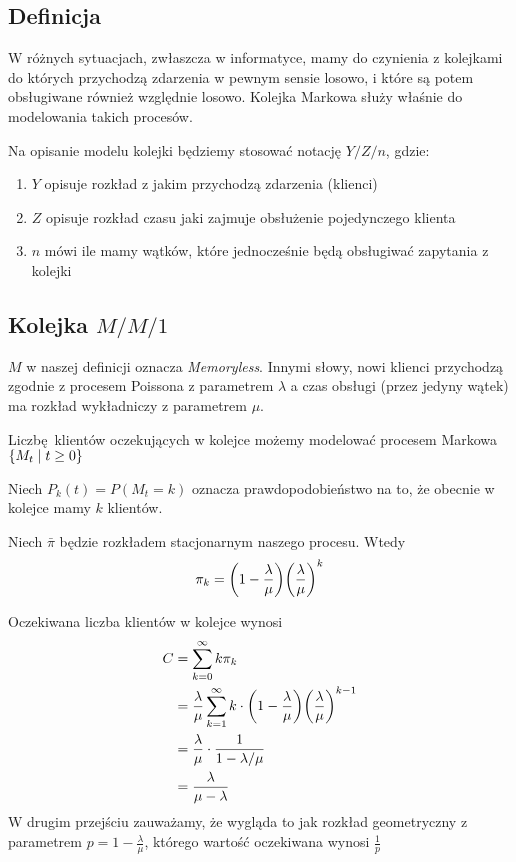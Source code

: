 \subsection{Definicja}

W różnych sytuacjach, zwłaszcza w informatyce, mamy do czynienia z kolejkami do których przychodzą zdarzenia w pewnym sensie losowo, i które są potem obsługiwane również względnie losowo. 
Kolejka Markowa służy właśnie do modelowania takich procesów.

Na opisanie modelu kolejki będziemy stosować notację \( Y / Z / n \), gdzie:
\begin{enumerate}
    \item \( Y \) opisuje rozkład z jakim przychodzą zdarzenia (klienci)
    \item \( Z \) opisuje rozkład czasu jaki zajmuje obsłużenie pojedynczego klienta
    \item \( n \) mówi ile mamy wątków, które jednocześnie będą obsługiwać zapytania z kolejki
\end{enumerate}

\subsection{Kolejka \( M / M / 1 \) }
\( M \) w naszej definicji oznacza \textit{Memoryless}.
Innymi słowy, nowi klienci przychodzą zgodnie z procesem Poissona z parametrem \( \lambda \)
a czas obsługi (przez jedyny wątek) ma rozkład wykładniczy z parametrem \( \mu \).

Liczbę klientów oczekujących w kolejce możemy modelować procesem Markowa 
\( \set{ M_t \mid t \geq 0 } \)

Niech \( P_k(t) = P(M_t = k) \) oznacza prawdopodobieństwo na to, że obecnie w kolejce mamy \( k \) klientów.

\begin{theorem}[strona 231 P\&C]
    Niech \( \bar \pi \) będzie rozkładem stacjonarnym naszego procesu. Wtedy
   \[ \pi_k = \pars{1 - \frac{\lambda}{\mu}}\pars{\frac{\lambda}{\mu}}^k \]
\end{theorem}

Oczekiwana liczba klientów w kolejce wynosi
\begin{align*}
    C 
    &= \sum_{k=0}^{\infty} k \pi_k \\
    &= \frac{\lambda}{\mu} \sum_{k=1}^\infty k \cdot \pars{1 - \frac{\lambda}{\mu}}\pars{\frac{\lambda}{\mu}}^{k-1} \\
    &= \frac{\lambda}{\mu} \cdot \frac{1}{1 - \lambda / \mu} \\
    &= \frac{\lambda}{\mu - \lambda}
\end{align*}
W drugim przejściu zauważamy, że wygląda to jak rozkład geometryczny z parametrem \( p = 1 - \frac{\lambda}{\mu} \),
którego wartość oczekiwana wynosi \( \frac{1}{p} \)

